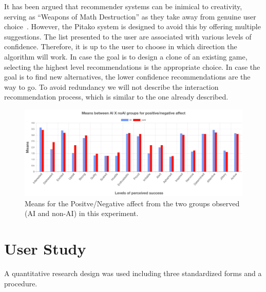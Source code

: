 \documentclass[letterpaper]{article} %
\begin{document}
It has been argued that recommender systems can be inimical to creativity, serving as ``Weapons of Math Destruction'' as they take away from genuine user choice~\cite{o2017weapons}. However, the Pitako system is designed to avoid this by offering multiple suggestions.  The list presented to the user are associated with various levels of confidence. Therefore, it is up to the user to choose in which direction the algorithm will work. In case the goal is to design a clone of an existing game, selecting the highest level recommendations is the appropriate choice. In case the goal is to find new alternatives, the lower confidence recommendations are the way to go. To avoid redundancy we will not describe the interaction recommendation process, which is similar to the one already described.



\begin{figure}[ht]
  \includegraphics[width=\linewidth]{panas.png}
  \caption{Means for the Positve/Negative affect from the two groups observed (AI and non-AI) in this experiment.}
  \label{panas}
\end{figure}

\section{User Study}
A quantitative research design was used including three standardized forms and a procedure.
\end{document}
